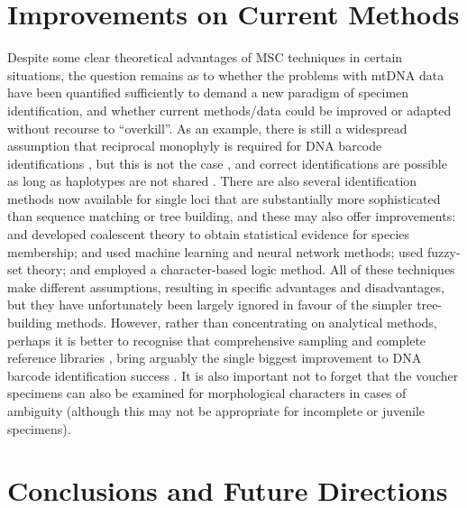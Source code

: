 \documentclass[12pt]{article}
\begin{document}
\section*{Improvements on Current Methods}

Despite some clear theoretical advantages of MSC techniques in certain situations, the question remains as to whether the problems with mtDNA data have been quantified sufficiently to demand a new paradigm of specimen identification, and whether current methods/data could be improved or adapted without recourse to ``overkill''. As an example, there is still a widespread assumption that reciprocal monophyly is required for DNA barcode identifications \citep{Goldstein2011}, but this is not the case \citep{Meier2008}, and correct identifications are possible as long as haplotypes are not shared \citep{Meier2006}. There are also several identification methods now available for single loci that are substantially more sophisticated than sequence matching or tree building, and these may also offer improvements: \citet{Nielsen2006} and \citet{Abdo2007} developed coalescent theory to obtain statistical evidence for species membership; \citet{Zhang2008} and \citet{Zhang2012a} used machine learning and neural network methods; \citet{Zhang2012b} used fuzzy-set theory; and \citet{Weitschek2013} employed a character-based logic method. All of these techniques make different assumptions, resulting in specific advantages and disadvantages, but they have unfortunately been largely ignored in favour of the simpler tree-building methods. However, rather than concentrating on analytical methods, perhaps it is better to recognise that comprehensive sampling and complete reference libraries \citep{Boykin2012,Virgilio2012}, bring arguably the single biggest improvement to DNA barcode identification success \citep{Ekrem2007}. It is also important not to forget that the  voucher specimens can also be examined for morphological characters in cases of ambiguity (although this may not be appropriate for incomplete or juvenile specimens).

\section*{Conclusions and Future Directions}
\end{document}
